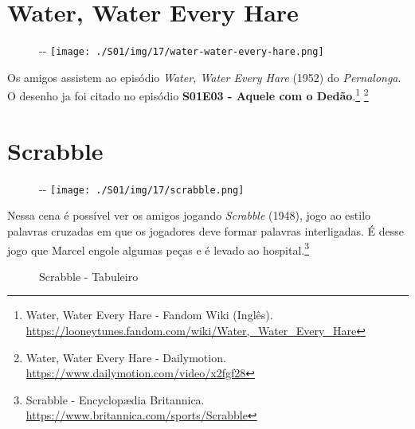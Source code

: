 \hypertarget{water-water-every-hare}{%
\section{Water, Water Every Hare}\label{water-water-every-hare}}

\begin{figure}[!ht]
  \begin{adjustwidth}{-\oddsidemargin-1in}{-\rightmargin}
    \centering
    \texttt{[image: ./S01/img/17/water-water-every-hare.png]}
  \end{adjustwidth}
\end{figure}

Os amigos assistem ao episódio \emph{Water, Water Every Hare} (1952) do
\emph{Pernalonga}. O desenho ja foi citado no episódio
\textbf{\textcolor{primarycolor}{S01E03 - Aquele com o Dedão}}.\footnote{\sloppy Water, Water Every Hare - Fandom Wiki (Inglês). \url{https://looneytunes.fandom.com/wiki/Water,_Water_Every_Hare}}
\footnote{\sloppy Water, Water Every Hare - Dailymotion. \url{https://www.dailymotion.com/video/x2fgf28}}

\hypertarget{scrabble}{%
\section{Scrabble}\label{scrabble}}

\begin{figure}[!ht]
  \begin{adjustwidth}{-\oddsidemargin-1in}{-\rightmargin}
    \centering
    \texttt{[image: ./S01/img/17/scrabble.png]}
  \end{adjustwidth}
\end{figure}

Nessa cena é possível ver os amigos jogando \emph{Scrabble} (1948), jogo
ao estilo palavras cruzadas em que os jogadores deve formar palavras
interligadas. É desse jogo que Marcel engole algumas peças e é levado ao
hospital.\footnote{\sloppy Scrabble - Encyclopædia Britannica. \url{https://www.britannica.com/sports/Scrabble}}

\begin{figure}
  \centering
    \caption{Scrabble - Tabuleiro\label{fig:scrabble-tabuleiro}}
\end{figure}

